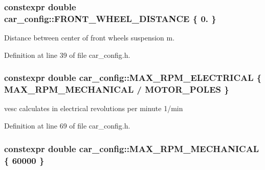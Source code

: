 \subsubsection[{\texorpdfstring{F\+R\+O\+N\+T\+\_\+\+W\+H\+E\+E\+L\+\_\+\+D\+I\+S\+T\+A\+N\+CE}{FRONT_WHEEL_DISTANCE}}]{\setlength{\rightskip}{0pt plus 5cm}constexpr double car\+\_\+config\+::\+F\+R\+O\+N\+T\+\_\+\+W\+H\+E\+E\+L\+\_\+\+D\+I\+S\+T\+A\+N\+CE \{ 0. \}}\hypertarget{namespacecar__config_a80d9d6f97a63ffcaba87b65a9e1e29e4}{}\label{namespacecar__config_a80d9d6f97a63ffcaba87b65a9e1e29e4}


Distance between center of front wheels suspension  m. 



Definition at line 39 of file car\+\_\+config.\+h.

\subsubsection[{\texorpdfstring{M\+A\+X\+\_\+\+R\+P\+M\+\_\+\+E\+L\+E\+C\+T\+R\+I\+C\+AL}{MAX_RPM_ELECTRICAL}}]{\setlength{\rightskip}{0pt plus 5cm}constexpr double car\+\_\+config\+::\+M\+A\+X\+\_\+\+R\+P\+M\+\_\+\+E\+L\+E\+C\+T\+R\+I\+C\+AL \{ {\bf M\+A\+X\+\_\+\+R\+P\+M\+\_\+\+M\+E\+C\+H\+A\+N\+I\+C\+AL} / {\bf M\+O\+T\+O\+R\+\_\+\+P\+O\+L\+ES} \}}\hypertarget{namespacecar__config_aaf4d6a90e2b9c983b0b0d29a584c399b}{}\label{namespacecar__config_aaf4d6a90e2b9c983b0b0d29a584c399b}


vesc calculates in electrical revolutions per minute  1/min 



Definition at line 69 of file car\+\_\+config.\+h.

\subsubsection[{\texorpdfstring{M\+A\+X\+\_\+\+R\+P\+M\+\_\+\+M\+E\+C\+H\+A\+N\+I\+C\+AL}{MAX_RPM_MECHANICAL}}]{\setlength{\rightskip}{0pt plus 5cm}constexpr double car\+\_\+config\+::\+M\+A\+X\+\_\+\+R\+P\+M\+\_\+\+M\+E\+C\+H\+A\+N\+I\+C\+AL \{ 60000 \}}\hypertarget{namespacecar__config_ad35069a183782259c6280aa219b72ffa}{}\label{namespacecar__config_ad35069a183782259c6280aa219b72ffa}


